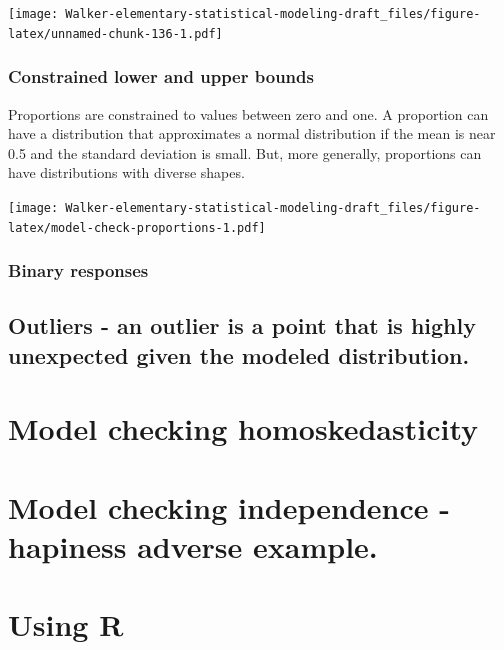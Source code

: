 \documentclass[]{book}
\begin{document}
\texttt{[image: Walker-elementary-statistical-modeling-draft\_files/figure-latex/unnamed-chunk-136-1.pdf]}

\hypertarget{constrained-lower-and-upper-bounds}{%
\subsubsection{Constrained lower and upper bounds}\label{constrained-lower-and-upper-bounds}}

Proportions are constrained to values between zero and one. A proportion can have a distribution that approximates a normal distribution if the mean is near 0.5 and the standard deviation is small. But, more generally, proportions can have distributions with diverse shapes.

\texttt{[image: Walker-elementary-statistical-modeling-draft\_files/figure-latex/model-check-proportions-1.pdf]}

\hypertarget{binary-responses}{%
\subsubsection{Binary responses}\label{binary-responses}}

\hypertarget{outliers---an-outlier-is-a-point-that-is-highly-unexpected-given-the-modeled-distribution.}{%
\subsection{Outliers - an outlier is a point that is highly unexpected given the modeled distribution.}\label{outliers---an-outlier-is-a-point-that-is-highly-unexpected-given-the-modeled-distribution.}}

\hypertarget{model-checking-homoskedasticity}{%
\section{Model checking homoskedasticity}\label{model-checking-homoskedasticity}}

\hypertarget{model-checking-independence---hapiness-adverse-example.}{%
\section{Model checking independence - hapiness adverse example.}\label{model-checking-independence---hapiness-adverse-example.}}

\hypertarget{using-r}{%
\section{Using R}\label{using-r}}
\end{document}
